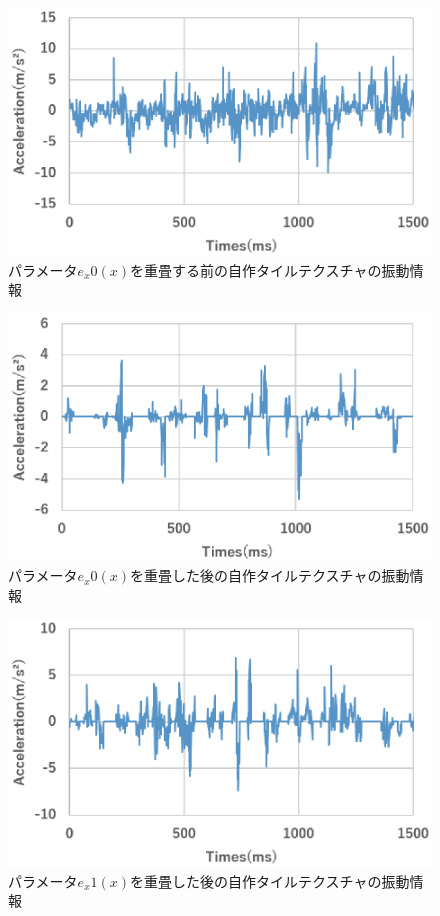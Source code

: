 \begin{figure}[ht]
\begin{center}
  \includegraphics[width=12cm]{acc1.eps}
  \caption{パラメータ$e_x0(x)$を重畳する前の自作タイルテクスチャの振動情報}
  \label{acc1}
\end{center}
\end{figure}


\begin{figure}[ht]
\begin{center}
  \includegraphics[width=12cm]{acc2.eps}
  \caption{パラメータ$e_x0(x)$を重畳した後の自作タイルテクスチャの振動情報}
  \label{acc2}
\end{center}
\end{figure}

\begin{figure}[ht]
\begin{center}
  \includegraphics[width=12cm]{acc3.eps}
  \caption{パラメータ$e_x1(x)$を重畳した後の自作タイルテクスチャの振動情報}
  \label{acc3}
\end{center}
\end{figure}



